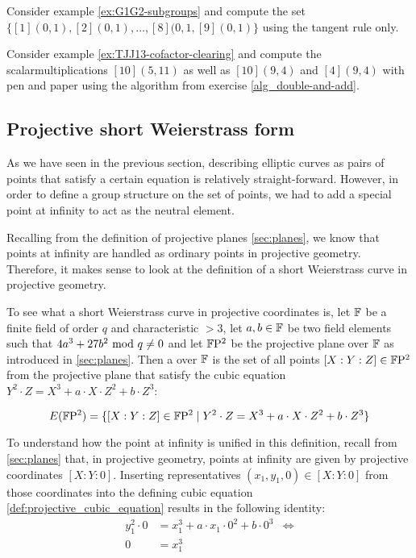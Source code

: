 \begin{exercise} Consider example \ref{ex:G1G2-subgroups} and compute the set 
$\{[1](0,1), [2](0,1),\ldots,[8](0,1,[9](0,1)\}$ using the tangent rule only.
\end{exercise}
\begin{exercise} Consider example \ref{ex:TJJ13-cofactor-clearing} and compute the scalarmultiplications $[10](5,11)$ as well as $[10](9,4)$ and $[4](9,4)$ with pen and paper using the algorithm from exercise \ref{alg_double-and-add}.
\end{exercise}
\subsection{Projective short Weierstrass form}
As we have seen in the previous section, describing elliptic curves as pairs of points that satisfy a certain equation is relatively straight-forward. However, in order to define a group structure on the set of points, we had to add a special point at infinity to act as the neutral element. 

Recalling from the definition of projective planes \ref{sec:planes}, we know that points at infinity are handled as ordinary points in projective geometry. Therefore, it makes  sense to look at the definition of a short Weierstrass curve in projective geometry.

To see what a short Weierstrass curve in projective coordinates is, let $\mathbb{F}$ be a finite field of order $q$ and characteristic $>3$, let $a,b\in \mathbb{F}$ be two field elements such that $4a^3+ 27b^2 \text{ mod } q\neq 0$ and let $\mathbb{F}\mathrm{P}^2$ be the projective plane over $\mathbb{F}$ as introduced in \ref{sec:planes}. Then a  over $\mathbb{F}$ is the set of all points $[X:Y:Z]\in \mathbb{F}\mathrm{P}^2$ from the projective plane that satisfy the cubic equation $Y^2\cdot Z = X^3+a\cdot X\cdot Z^2 + b\cdot Z^3$:

\begin{equation}
\label{def:projective_cubic_equation}
E(\mathbb{F}\mathrm{P}^2) = \{[X:Y:Z]\in \mathbb{F}\mathrm{P}^2\;|\; Y^2\cdot Z = X^3+a\cdot X\cdot Z^2 + b\cdot Z^3 \}
\end{equation}

To understand how the point at infinity is unified in this definition, recall from \ref{sec:planes} that, in projective geometry, points at infinity are given by projective coordinates $[X:Y:0]$. Inserting representatives $(x_1,y_1,0)\in [X:Y:0]$ from those coordinates into the defining cubic equation \ref{def:projective_cubic_equation} results in the following identity:
\begin{align*}
y_1^2\cdot 0 & = x_1^3+a\cdot x_1\cdot 0^2 + b\cdot 0^3 & \Leftrightarrow \\
0 & = x_1^3
\end{align*} 

